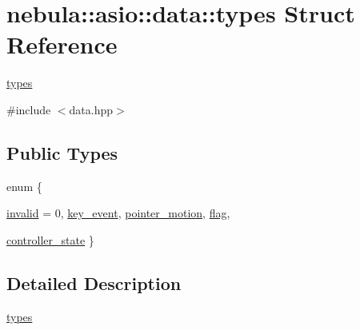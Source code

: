\hypertarget{structnebula_1_1asio_1_1data_1_1types}{
\section{nebula::asio::data::types Struct Reference}
\label{structnebula_1_1asio_1_1data_1_1types}
}


\hyperlink{structnebula_1_1asio_1_1data_1_1types}{types}  


{\ttfamily \#include $<$data.hpp$>$}\subsection*{Public Types}
\begin{DoxyCompactItemize}
\item 
enum \{ \par
\hyperlink{structnebula_1_1asio_1_1data_1_1types_ab4803f0edde24938a98f5a248aac2b0cafb7ca4e7078d03022acd574c295390c6}{invalid} =  0, 
\hyperlink{structnebula_1_1asio_1_1data_1_1types_ab4803f0edde24938a98f5a248aac2b0ca373d3db430467ca09651c9f76f799e79}{key\_\-event}, 
\hyperlink{structnebula_1_1asio_1_1data_1_1types_ab4803f0edde24938a98f5a248aac2b0cae77c12a73577ff9d3cdbf0608202c316}{pointer\_\-motion}, 
\hyperlink{structnebula_1_1asio_1_1data_1_1types_ab4803f0edde24938a98f5a248aac2b0ca209467545d396a9046ef13b9aa6461a4}{flag}, 
\par
\hyperlink{structnebula_1_1asio_1_1data_1_1types_ab4803f0edde24938a98f5a248aac2b0ca6b6ab9a6a92260bf5695a014f62dc25f}{controller\_\-state}
 \}
\end{DoxyCompactItemize}


\subsection{Detailed Description}
\hyperlink{structnebula_1_1asio_1_1data_1_1types}{types} 

